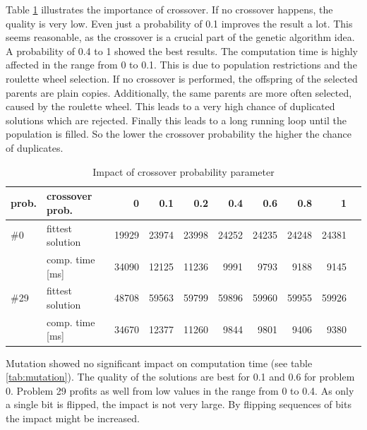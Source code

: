 \documentclass[a4paper]{article}
\begin{document}
Table \ref{tab:crossover} illustrates the importance of crossover. If no crossover happens, the quality is very low. Even just a probability of 0.1 improves the result a lot. This seems reasonable, as the crossover is a crucial part of the genetic algorithm idea. A probability of 0.4 to 1 showed the best results. The computation time is highly affected in the range from 0 to 0.1. This is due to population restrictions and the roulette wheel selection. If no crossover is performed, the offspring of the selected parents are plain copies. Additionally, the same parents are more often selected, caused by the roulette wheel. This leads to a very high chance of duplicated solutions which are rejected. Finally this leads to a long running loop until the population is filled. So the lower the crossover probability the higher the chance of duplicates.

\begin{table}[h t b p]
\begin{center}
\begin{tabular}{ l | l | r | r | r | r | r | r | r | r }
prob. & crossover prob. & 0 & 0.1 & 0.2 & 0.4 & 0.6 & 0.8 & 1 \\
\hline
\#0  & fittest solution	& 19929 & 23974 & 23998 & 24252 & 24235 & 24248 & 24381 \\
& 	comp. time [ms]	  	& 34090 & 12125 & 11236 & 9991 & 9793 & 9188 & 9145 \\
\hline
\#29 & fittest solution	& 48708 & 59563 & 59799 & 59896 & 59960 & 59955 & 59926 \\
& 	comp. time [ms]	  	& 34670 & 12377 & 11260 & 9844 & 9801 & 9406 & 9380 \\
\end{tabular}
\caption{Impact of crossover probability parameter}
\label{tab:crossover}
\end{center}
\end{table}

Mutation showed no significant impact on computation time (see table \ref{tab:mutation}). The quality of the solutions are best for 0.1 and 0.6 for problem 0. Problem 29 profits as well from low values in the range from 0 to 0.4. As only a single bit is flipped, the impact is not very large. By flipping sequences of bits the impact might be increased. 
\end{document}
